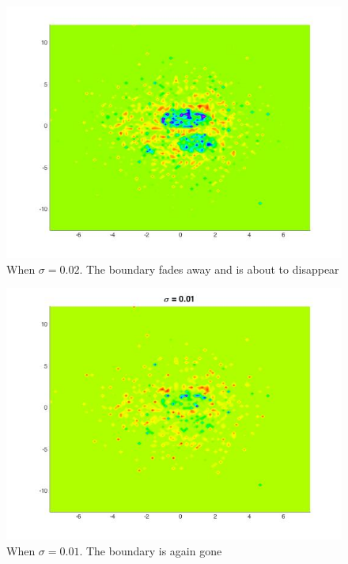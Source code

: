 \documentclass[twoside]{article}
\theoremstyle{definition}
\theoremstyle{definition}
\theoremstyle{remark}
\begin{document}
\begin{figure}[H]
\centering
\includegraphics[width=120mm]{sigma_002.jpg}
\caption{ When $\sigma = 0.02$. The boundary fades away and is about to disappear\label{problem2Pic5}}
\end{figure}

\begin{figure}[H]
\centering
\includegraphics[width=120mm]{sigma_001.jpg}
\caption{ When $\sigma = 0.01$. The boundary is again gone\label{problem2Pic6}}
\end{figure}
\end{document}
